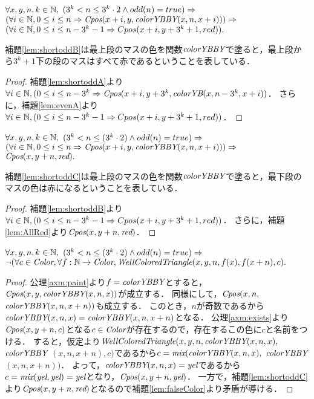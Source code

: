 \begin{lem}[\ShortOddB] \label{lem:shortoddB}
  $\forall x,y,n,k \in \mathbb{N},$
  $(3^k < n \leq 3^k\cdot2 \land odd(n) = true) \Rightarrow$
  $(\forall i \in \mathbb{N}, 0 \leq i \leq n \Rightarrow \textit{Cpos}(x+i,y,\textit{colorYBBY}(x,n,x+i))) \Rightarrow$
  $(\forall i \in \mathbb{N}, 0 \leq i \leq n - 3^k-1 \Rightarrow Cpos(x+i,y+3^k+1,red)).$
\end{lem}
補題\ref{lem:shortoddB}は最上段のマスの色を関数$\textit{colorYBBY}$で塗ると，最上段から$3^k+1$下の段のマスはすべて赤であるということを表している．
\begin{proof}
  補題\ref{lem:shortoddA}より$\forall i \in \mathbb{N},(0 \leq i \leq n - 3^k \Rightarrow \textit{Cpos}(x+i,y+3^k,\textit{colorYB}(x,n-3^k,x+i))$．
  さらに，補題\ref{lem:evenA}より$\forall i \in \mathbb{N}, (0 \leq i \leq n - 3^k-1 \Rightarrow Cpos(x+i,y+3^k+1,red))$．
\end{proof}

\begin{lem}[\ShortOddC] \label{lem:shortoddC}
  $\forall x,y,n,k \in \mathbb{N},$
  $(3^k < n \leq (3^k\cdot2) \land odd(n) = true) \Rightarrow$
  $(\forall i \in \mathbb{N}, 0 \leq i \leq n \Rightarrow \textit{Cpos}(x+i,y,\textit{colorYBBY}(x,n,x+i))) \Rightarrow$
  $\textit{Cpos}(x,y+n,\textit{red}).$
\end{lem}
補題\ref{lem:shortoddC}は最上段のマスの色を関数$\textit{colorYBBY}$で塗ると，最下段のマスの色は赤になるということを表している．
\begin{proof}
  補題\ref{lem:shortoddB}より$\forall i \in \mathbb{N}, (0 \leq i \leq n - 3^k-1 \Rightarrow Cpos(x+i,y+3^k+1,red))$．
  さらに，補題\ref{lem:AllRed}より$\textit{Cpos}(x,y+n,\textit{red})$．
\end{proof}

\begin{lem}[\ShortOdd] \label{lem:shortodd}
  $\forall x,y,n,k \in \mathbb{N},$
  $(3^k < n \leq (3^k\cdot2) \land odd(n) = true) \Rightarrow$
  $\lnot(\forall c \in \textit{Color}, \forall f:\mathbb{N} \to \textit{Color}, \textit{WellColoredTriangle}(x,y,n,f(x),f(x+n), c).$
\end{lem}
\begin{proof}
  公理\ref{axm:paint}より$f=\textit{colorYBBY}$とすると，$\textit{Cpos}(x,y,\textit{colorYBBY}(x,n,x))$が成立する．
  同様にして，$\textit{Cpos}(x,n,$ $\textit{colorYBBY}(x,n,x+n))$も成立する．
  このとき，$n$が奇数であるから$\textit{colorYBBY}(x,n,x)=\textit{colorYBBY}(x,n,x+n)$となる．
  公理\ref{axm:exists}より$\textit{Cpos}(x,y+n,c)$となる$c\in\textit{Color}$が存在するので，存在するこの色に$c$と名前をつける．
  すると，仮定より$\textit{WellColoredTriangle}(x,y,n,\textit{colorYBBY}(x,n,x),$ $\textit{colorYBBY}$ $(x,n,x+n),c)$であるから$c=\textit{mix}(\textit{colorYBBY}(x,n,x),$ $\textit{colorYBBY}$ $(x,n,x+n))$．
  よって，$\textit{colorYBBY}(x,n,x)=\textit{yel}$であるから$c=\textit{mix}(\textit{yel},\textit{yel})=\textit{yel}$となり，$\textit{Cpos}(x,y+n,\textit{yel})$．
  一方で，補題\ref{lem:shortoddC}より$\textit{Cpos}(x,y+n,\textit{red})$となるので補題\ref{lem:falseColor}より矛盾が導ける．
\end{proof}


